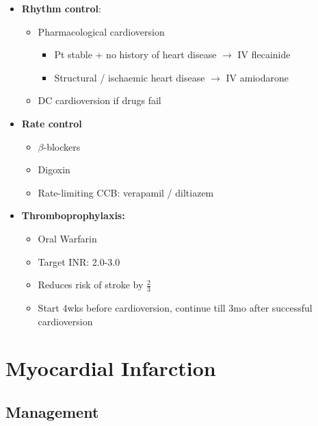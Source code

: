 \documentclass[
  12pt,
]{memoir}
\providecommand{\tightlist}{%
  \setlength{\itemsep}{0pt}\setlength{\parskip}{0pt}}
\begin{document}
\begin{itemize}
\tightlist
\item
  \textbf{Rhythm control}:

  \begin{itemize}
  \tightlist
  \item
    Pharmacological cardioversion

    \begin{itemize}
    \tightlist
    \item
      Pt stable + no history of heart disease \(\rightarrow\) IV
      flecainide
    \item
      Structural / ischaemic heart disease \(\rightarrow\) IV amiodarone
    \end{itemize}
  \item
    DC cardioversion if drugs fail
  \end{itemize}
\item
  \textbf{Rate control}

  \begin{itemize}
  \tightlist
  \item
    \(\beta\)-blockers
  \item
    Digoxin
  \item
    Rate-limiting CCB: verapamil / diltiazem
  \end{itemize}
\item
  \textbf{Thromboprophylaxis:}

  \begin{itemize}
  \tightlist
  \item
    Oral Warfarin
  \item
    Target INR: 2.0-3.0
  \item
    Reduces risk of stroke by \(\frac{2}{3}\)
  \item
    Start 4wks before cardioversion, continue till 3mo after successful
    cardioversion
  \end{itemize}
\end{itemize}

\hypertarget{myocardial-infarction-1}{%
\section{Myocardial Infarction}\label{myocardial-infarction-1}}

\hypertarget{management}{%
\subsection{Management}\label{management}}
\end{document}
